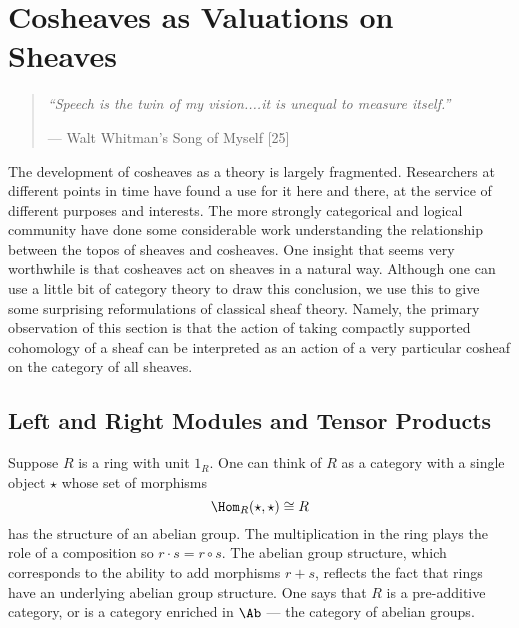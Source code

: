 

%
%

\chapter{Cosheaves as Valuations on Sheaves}
\label{sec:valuations}

\begin{quote}
{\em``Speech is the twin of my vision....it is unequal to measure itself.''}
\begin{flushright} --- Walt Whitman's Song of Myself [25] \end{flushright}
\end{quote}


The development of cosheaves as a theory is largely fragmented. Researchers at different points in time have found a use for it here and there, at the service of different purposes and interests. The more strongly categorical and logical community have done some considerable work understanding the relationship between the topos of sheaves and cosheaves. One insight that seems very worthwhile is that cosheaves act on sheaves in a natural way. Although one can use a little bit of category theory to draw this conclusion, we use this to give some surprising reformulations of classical sheaf theory. Namely, the primary observation of this section is that the action of taking compactly supported cohomology of a sheaf can be interpreted as an action of a very particular cosheaf on the category of all sheaves.

\section{Left and Right Modules and Tensor Products}
Suppose $R$ is a ring with unit $1_R$. One can think of $R$ as a category with a single object $\star$ whose set of morphisms
\[
	\Hom_R(\star,\star)\cong R
\]
has the structure of an abelian group. The multiplication in the ring plays the role of a composition so $r\cdot s=r\circ s$. The abelian group structure, which corresponds to the ability to add morphisms $r+s$, reflects the fact that rings have an underlying abelian group structure. One says that $R$ is a pre-additive category, or is a category enriched in $\Ab$ --- the category of abelian groups.


